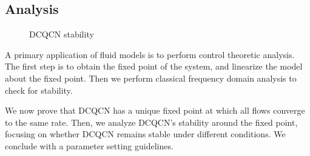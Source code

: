 \subsection{Analysis}
\label{sec:dcqcn_stability}

\begin{figure}[t]
\caption{DCQCN stability}
\label{fig:dcqcn_stability}
\end{figure}

A primary application of fluid models is to perform control theoretic analysis.
The first step is to obtain the fixed point of the system, and linearize the
model about the fixed point. Then we perform classical frequency domain
analysis to check for stability.

We now prove that DCQCN has a unique fixed point at which all flows converge to
the same rate. Then, we analyze DCQCN's stability around the fixed point,
focusing on whether DCQCN remains stable under different conditions. We conclude
with a parameter setting guidelines.

